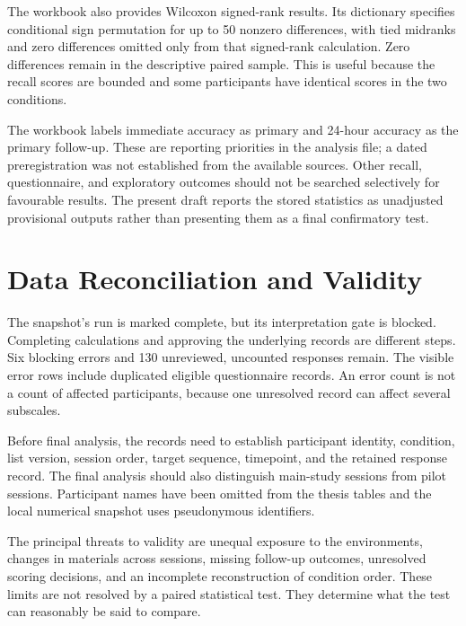 The workbook also provides Wilcoxon signed-rank results. Its dictionary specifies conditional sign permutation for up to 50 nonzero differences, with tied midranks and zero differences omitted only from that signed-rank calculation. Zero differences remain in the descriptive paired sample. This is useful because the recall scores are bounded and some participants have identical scores in the two conditions.

The workbook labels immediate accuracy as primary and 24-hour accuracy as the primary follow-up. These are reporting priorities in the analysis file; a dated preregistration was not established from the available sources. Other recall, questionnaire, and exploratory outcomes should not be searched selectively for favourable results. The present draft reports the stored statistics as unadjusted provisional outputs rather than presenting them as a final confirmatory test.

\section{Data Reconciliation and Validity}
The snapshot's run is marked complete, but its interpretation gate is blocked. Completing calculations and approving the underlying records are different steps. Six blocking errors and 130 unreviewed, uncounted responses remain. The visible error rows include duplicated eligible questionnaire records. An error count is not a count of affected participants, because one unresolved record can affect several subscales.

Before final analysis, the records need to establish participant identity, condition, list version, session order, target sequence, timepoint, and the retained response record. The final analysis should also distinguish main-study sessions from pilot sessions. Participant names have been omitted from the thesis tables and the local numerical snapshot uses pseudonymous identifiers.

The principal threats to validity are unequal exposure to the environments, changes in materials across sessions, missing follow-up outcomes, unresolved scoring decisions, and an incomplete reconstruction of condition order. These limits are not resolved by a paired statistical test. They determine what the test can reasonably be said to compare.

